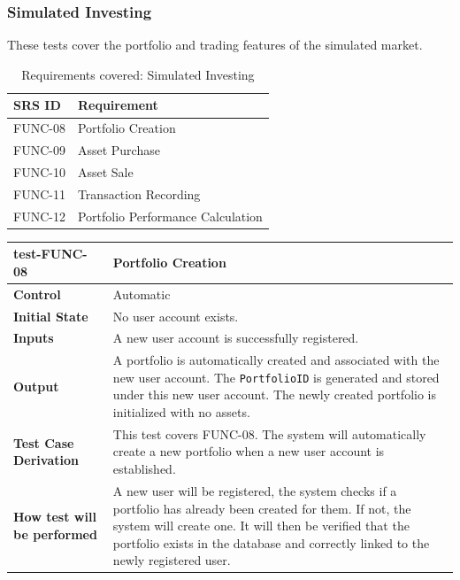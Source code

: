 \documentclass[12pt, titlepage]{article}
\begin{document}
\subsubsection{Simulated Investing}

These tests cover the portfolio and trading features of the simulated market.

\begin{table}[H]
  \caption{Requirements covered: Simulated Investing}
  \noindent\begin{tabularx}{\textwidth}{p{3cm}X}
  \toprule
  \textbf{SRS ID} & \textbf{Requirement} \\
  \midrule
  FUNC-08 & Portfolio Creation \\
  FUNC-09 & Asset Purchase \\
  FUNC-10 & Asset Sale \\
  FUNC-11 & Transaction Recording \\
  FUNC-12 & Portfolio Performance Calculation \\
  \bottomrule
\end{tabularx}
\end{table}

\vspace{1em}

\noindent\begin{tabularx}{\textwidth}{>{\raggedright\arraybackslash}p{3.5cm}X}
  \toprule
  \textbf{test-FUNC-08} & \textbf{Portfolio Creation}\\
  \midrule
  \textbf{Control} & Automatic\\
  \textbf{Initial State} & No user account exists.\\
  \textbf{Inputs} & A new user account is successfully registered.\\
  \textbf{Output} & A portfolio is automatically created and associated with the new user account. The \texttt{PortfolioID} is generated and stored under this new user account. The newly created portfolio is initialized with no assets.\\
  \textbf{Test Case Derivation} & This test covers FUNC-08. The system will automatically create a new portfolio when a new user account is established.\\
  \textbf{How test will be performed} & A new user will be registered, the system checks if a portfolio has already been created for them. If not, the system will create one. It will then be verified that the portfolio exists in the database and correctly linked to the newly registered user.\\
  \bottomrule
\end{tabularx}
\end{document}
